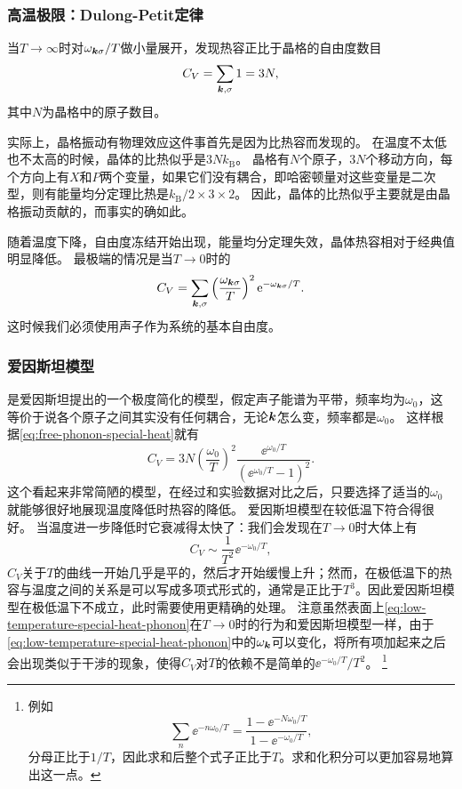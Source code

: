 \subsubsection{高温极限：Dulong-Petit定律} 

当$T \to \infty$时对$\omega_{\vb*{k} \sigma} / T$做小量展开，发现热容正比于晶格的自由度数目
\begin{equation}
    C_V = \sum_{\vb*{k}, \sigma} 1 = 3 N ,
\end{equation}
其中$N$为晶格中的原子数目。

实际上，晶格振动有物理效应这件事首先是因为比热容而发现的。
在温度不太低也不太高的时候，晶体的比热似乎是$3 N k_\text{B}$。
晶格有$N$个原子，$3N$个移动方向，每个方向上有$X$和$P$两个变量，如果它们没有耦合，即哈密顿量对这些变量是二次型，则有能量均分定理比热是$k_\text{B}/2 \times 3 \times 2$。
因此，晶体的比热似乎主要就是由晶格振动贡献的，而事实的确如此。

随着温度下降，自由度冻结开始出现，能量均分定理失效，晶体热容相对于经典值明显降低。
最极端的情况是当$T \to 0$时的
\begin{equation}
    C_V = \sum_{\vb*{k}, \sigma} \left(\frac{\omega_{\vb*{k}\sigma}}{T}\right)^2 \mathrm{e}^{-\omega_{\vb*{k}\sigma} / T}.
    \label{eq:low-temperature-special-heat-phonon}
\end{equation}
这时候我们必须使用声子作为系统的基本自由度。

\subsubsection{爱因斯坦模型} 

是爱因斯坦提出的一个极度简化的模型，假定声子能谱为平带，频率均为$\omega_0$，这等价于说各个原子之间其实没有任何耦合，无论$\vb*{k}$怎么变，频率都是$\omega_0$。
这样根据\eqref{eq:free-phonon-special-heat}就有
\begin{equation}
    C_V = 3 N \left(\frac{\omega_0}{T}\right)^2 \frac{\ee^{\omega_0 / T}}{(\ee^{\omega_0 / T} - 1)^2}.
\end{equation}
这个看起来非常简陋的模型，在经过和实验数据对比之后，只要选择了适当的$\omega_0$就能够很好地展现温度降低时热容的降低。
爱因斯坦模型在较低温下符合得很好。
当温度进一步降低时它衰减得太快了：我们会发现在$T \to 0$时大体上有
\[
    C_V \sim \frac{1}{T^2} \ee^{- \omega_0 / T},
\]
$C_V$关于$T$的曲线一开始几乎是平的，然后才开始缓慢上升；然而，在极低温下的热容与温度之间的关系是可以写成多项式形式的，通常是正比于$T^3$。因此爱因斯坦模型在极低温下不成立，此时需要使用更精确的处理。
注意虽然表面上\eqref{eq:low-temperature-special-heat-phonon}在$T \to 0$时的行为和爱因斯坦模型一样，由于\eqref{eq:low-temperature-special-heat-phonon}中的$\omega_{\vb*{k}}$可以变化，将所有项加起来之后会出现类似于干涉的现象，使得$C_V$对$T$的依赖不是简单的$\ee^{- \omega_0 / T} / T^2$。%
\footnote{
    例如
    \[
        \sum_n \ee^{- n \omega_0 / T} = \frac{1 - \ee^{- N \omega_0 / T}}{1 - \ee^{- \omega_0 / T}},
    \]
    分母正比于$1/T$，因此求和后整个式子正比于$T$。求和化积分可以更加容易地算出这一点。
}%

